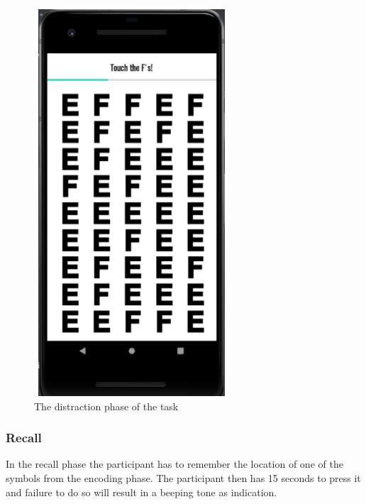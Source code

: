 \documentclass{article}
\begin{document}
\begin{figure}[!h]
  \begin{center}
    \includegraphics[scale=0.8]{Android5.png}
    \caption{The distraction phase of the task
}
    \label{fig:android5}
  \end{center}
\end{figure}

\subsubsection{Recall}
In the recall phase the participant has to remember the location of one of the symbols from the encoding phase. The participant then has 15 seconds to press it and failure to do so will result in a beeping tone as indication.
\end{document}
